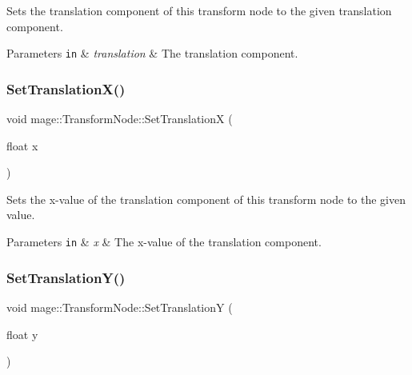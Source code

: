 Sets the translation component of this transform node to the given translation component.


\begin{DoxyParams}[1]{Parameters}
\mbox{\tt in}  & {\em translation} & The translation component. \\
\hline
\end{DoxyParams}
\hypertarget{structmage_1_1_transform_node_ae56c297f2c7645d853e75e095ea7fedf}{}\label{structmage_1_1_transform_node_ae56c297f2c7645d853e75e095ea7fedf} 
\subsubsection{\texorpdfstring{Set\+Translation\+X()}{SetTranslationX()}}
{\footnotesize\ttfamily void mage\+::\+Transform\+Node\+::\+Set\+TranslationX (\begin{DoxyParamCaption}\item[{float}]{x }\end{DoxyParamCaption})\hspace{0.3cm}{\ttfamily [noexcept]}}

Sets the x-\/value of the translation component of this transform node to the given value.


\begin{DoxyParams}[1]{Parameters}
\mbox{\tt in}  & {\em x} & The x-\/value of the translation component. \\
\hline
\end{DoxyParams}
\hypertarget{structmage_1_1_transform_node_a323420dba6c3c925cef64c6c94b941c3}{}\label{structmage_1_1_transform_node_a323420dba6c3c925cef64c6c94b941c3} 
\subsubsection{\texorpdfstring{Set\+Translation\+Y()}{SetTranslationY()}}
{\footnotesize\ttfamily void mage\+::\+Transform\+Node\+::\+Set\+TranslationY (\begin{DoxyParamCaption}\item[{float}]{y }\end{DoxyParamCaption})\hspace{0.3cm}{\ttfamily [noexcept]}}


